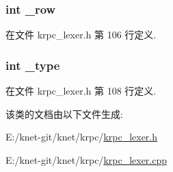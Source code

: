 \hypertarget{classkrpc__token__t_a2c788815cbc67c3734ad77878c81dda8}{}
\subsubsection[{\+\_\+row}]{\setlength{\rightskip}{0pt plus 5cm}int \+\_\+row\hspace{0.3cm}{\ttfamily [private]}}\label{classkrpc__token__t_a2c788815cbc67c3734ad77878c81dda8}


在文件 krpc\+\_\+lexer.\+h 第 106 行定义.

\hypertarget{classkrpc__token__t_a4a8a31fad0e6b95531e63101dea58c4b}{}
\subsubsection[{\+\_\+type}]{\setlength{\rightskip}{0pt plus 5cm}int \+\_\+type\hspace{0.3cm}{\ttfamily [private]}}\label{classkrpc__token__t_a4a8a31fad0e6b95531e63101dea58c4b}


在文件 krpc\+\_\+lexer.\+h 第 108 行定义.



该类的文档由以下文件生成\+:\begin{DoxyCompactItemize}
\item 
E\+:/knet-\/git/knet/krpc/\hyperlink{krpc__lexer_8h}{krpc\+\_\+lexer.\+h}\item 
E\+:/knet-\/git/knet/krpc/\hyperlink{krpc__lexer_8cpp}{krpc\+\_\+lexer.\+cpp}\end{DoxyCompactItemize}
